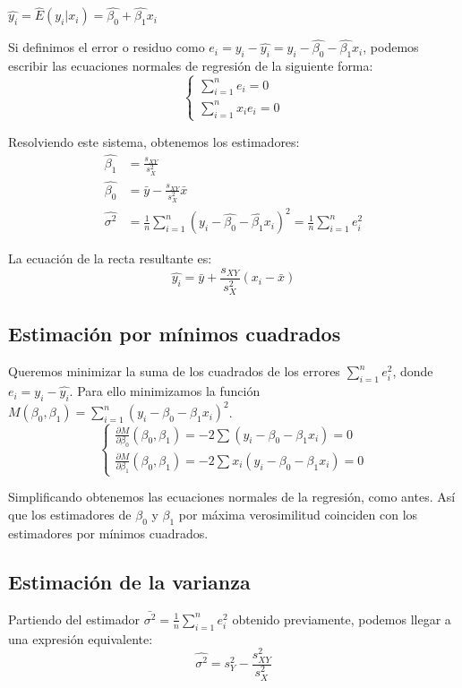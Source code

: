 \begin{notation}
    $\hat{y_i} = \hat{E}(y_i | x_i) = \hat{\beta_0} + \hat{\beta_1}x_i$
\end{notation}

Si definimos el error o residuo como $e_i = y_i - \hat{y_i} = y_i - \hat{\beta_0} - \hat{\beta_1}x_i$, podemos escribir las ecuaciones normales de regresión de la siguiente forma:
$$\begin{cases}
        \sum_{i=1}^n e_i = 0 \\
        \sum_{i=1}^n x_ie_i = 0
    \end{cases}$$

Resolviendo este sistema, obtenemos los estimadores:
\begin{align*}
    \hat{\beta_1}  & = \frac{s_{XY}}{s_X^2}                                                                                 \\
    \hat{\beta_0}  & = \bar{y} - \frac{s_{XY}}{s_X^2}\bar{x}                                                                \\
    \hat{\sigma^2} & = \frac{1}{n} \sum_{i=1}^n (y_i - \hat{\beta_0} - \hat{\beta_1}x_i)^2 = \frac{1}{n} \sum_{i=1}^n e_i^2
\end{align*}

La ecuación de la recta resultante es:
$$\hat{y_i} = \bar{y} + \frac{s_{XY}}{s_X^2}(x_i - \bar{x})$$

\subsection*{Estimación por mínimos cuadrados}
Queremos minimizar la suma de los cuadrados de los errores $\sum_{i=1}^n e_i^2$, donde $e_i = y_i - \hat{y_i}$.
Para ello minimizamos la función $M(\beta_0, \beta_1) = \sum_{i=1}^n (y_i - \beta_0 - \beta_1x_i)^2$.
$$\begin{cases}
        \frac{\partial M}{\partial \beta_0}(\beta_0, \beta_1) = -2\sum(y_i - \beta_0 - \beta_1x_i) = 0 \\
        \frac{\partial M}{\partial \beta_1}(\beta_0, \beta_1) = -2\sum x_i(y_i - \beta_0 - \beta_1x_i) = 0
    \end{cases}$$

Simplificando obtenemos las ecuaciones normales de la regresión, como antes.
Así que los estimadores de $\beta_0$ y $\beta_1$ por máxima verosimilitud coinciden con los estimadores por mínimos cuadrados.

\subsection*{Estimación de la varianza}
Partiendo del estimador $\bar{\sigma^2} = \frac{1}{n} \sum_{i=1}^n e_i^2$ obtenido previamente, podemos llegar a una expresión equivalente:
$$\hat{\sigma^2} = s_Y^2 - \frac{s_{XY}^2}{s_X^2}$$

